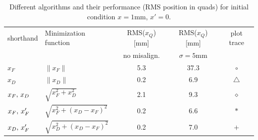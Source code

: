 \begin{table}[h]
\centering
\caption{Different algorithms and their performance (RMS position in quads) for initial condition $x=1$mm, $x'=0$. }
\label{tab:steeringalgorithm}
\begin{tabular}{|l|l|c|c|c|}
\hline
shorthand & Minimization function & RMS($x_Q$) [mm] & RMS($x_Q$) [mm]  & plot trace \\
& & no misalign. & $\sigma=5$mm & \\
\hline
$x_F$ & $\| x_F \|$ & 5.3 & 37.3 & {\color{blue} $\circ$} \\
$x_D$ & $\| x_D \|$ & 0.2 & 6.9 & {\color{red} $\triangle$} \\
$x_F,\thinspace x_D$ & $\sqrt{x_F^2+x_D^2}$ &  2.1 & 9.3 & {\color{cyan} $\diamond$} \\
$x_F,\thinspace x'_F$ & $\sqrt{x_F^2+(x_D-x_F)^2}$ & 0.2 & 6.6 & $\ast$ \\
$x_D,\thinspace x'_F$ & $\sqrt{x_D^2+(x_D-x_F)^2}$  & 0.2 & 7.0 & {\color{magenta} $+$} \\
\hline
\end{tabular}
\end{table}




